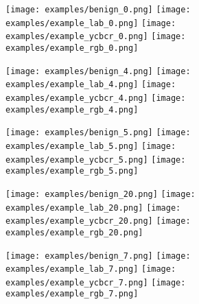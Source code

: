 \begin{figure}[t]
    \begin{subfigure}[b]{\linewidth}
        \caption{}

        \texttt{[image: examples/benign\_0.png]}
        \texttt{[image: examples/example\_lab\_0.png]}
        \texttt{[image: examples/example\_ycbcr\_0.png]}
        \texttt{[image: examples/example\_rgb\_0.png]}
    \end{subfigure}

    \begin{subfigure}[b]{\linewidth}
        \caption{}
        \texttt{[image: examples/benign\_4.png]}
        \texttt{[image: examples/example\_lab\_4.png]}
        \texttt{[image: examples/example\_ycbcr\_4.png]}
        \texttt{[image: examples/example\_rgb\_4.png]}
    \end{subfigure}

    \begin{subfigure}[b]{\linewidth}
        \caption{}
        \texttt{[image: examples/benign\_5.png]}
        \texttt{[image: examples/example\_lab\_5.png]}
        \texttt{[image: examples/example\_ycbcr\_5.png]}
        \texttt{[image: examples/example\_rgb\_5.png]}
    \end{subfigure}

    \ContinuedFloat
    \begin{subfigure}[b]{\linewidth}
        \caption{}
        \texttt{[image: examples/benign\_20.png]}
        \texttt{[image: examples/example\_lab\_20.png]}
        \texttt{[image: examples/example\_ycbcr\_20.png]}
        \texttt{[image: examples/example\_rgb\_20.png]}
    \end{subfigure}

    \ContinuedFloat
    \begin{subfigure}[b]{\linewidth}
        \caption{}
        \texttt{[image: examples/benign\_7.png]}
        \texttt{[image: examples/example\_lab\_7.png]}
        \texttt{[image: examples/example\_ycbcr\_7.png]}
        \texttt{[image: examples/example\_rgb\_7.png]}
    \end{subfigure}


\end{figure}
